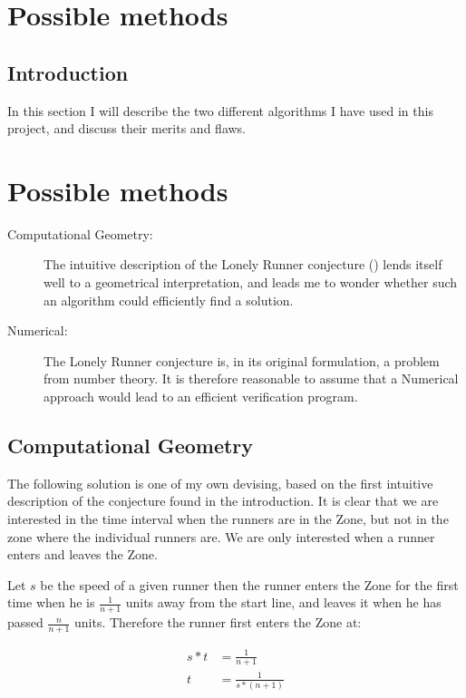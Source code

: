 \section{Possible methods}
\label{choiceOfMethod}

\subsection{Introduction}
In this section I will describe the two different algorithms I have used in this project, and discuss their merits and flaws.\\

\section{Possible methods}

\begin{description}
\item[Computational Geometry:] The intuitive description of the Lonely Runner conjecture () lends itself well to a geometrical interpretation, and leads me to wonder whether such an algorithm could efficiently find a solution.

\item[Numerical:] The Lonely Runner conjecture is, in its original formulation, a problem from number theory. It is therefore reasonable to assume that a Numerical approach would lead to an efficient verification program.
\end{description}

\subsection{Computational Geometry}
\label{compGeo}
The following solution is one of my own devising, based on the first intuitive description of the conjecture found in the introduction. It is clear that we are interested in the time interval when the runners are in the Zone, but not in the zone where the individual runners are. We are only interested when a runner enters and leaves the Zone. 

Let $s$ be the speed of a given runner then the runner enters the Zone for the first time when he is $\frac{1}{n+1}$ units away from the start line, and leaves it when he has passed $\frac{n}{n+1}$ units.
Therefore the runner first enters the Zone at: 

\begin{equation}
\label{eqa:speedOne}
\begin{split}
s * t &= \frac{1}{n+1} \\
t &= \frac{1}{s * (n+1)}
\end{split}
\end{equation}

